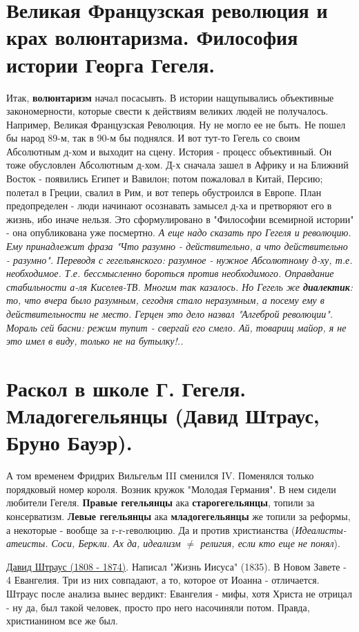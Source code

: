 \section{Великая Французская революция и крах волюнтаризма.  Философия истории Георга Гегеля. }
Итак, \textbf{волюнтаризм} начал посасывть. В истории нащупывались объективные закономерности, которые свести к действиям великих людей не получалось. Например, Великая Французская Революция. Ну не могло ее не быть. Не пошел бы народ 89-м, так в 90-м бы поднялся. И вот тут-то Гегель со своим Абсолютным д-хом и выходит на сцену. История - процесс объективный. Он тоже обусловлен Абсолютным д-хом. Д-х сначала зашел в Африку и на Ближний Восток - появились Египет и Вавилон; потом пожаловал в Китай, Персию; полетал в Греции, свалил в Рим, и вот теперь обустроился в Европе. План предопределен - люди начинают осознавать замысел д-ха и претворяют его в жизнь, ибо иначе нельзя. Это сформулировано в "Философии всемирной истории" - она опубликована уже посмертно. \textit{А еще надо сказать про Гегеля и революцию. Ему принадлежит фраза "Что разумно - действительно, а что действительно - разумно". Переводя с гегельянского: разумное - нужное Абсолютному д-ху, т.е. необходимое. Т.е. бессмысленно бороться против необходимого. Оправдание стабильности а-ля Киселев-ТВ. Многим так казалось. Но Гегель же \textbf{диалектик}: то, что вчера было разумным, сегодня стало неразумным, а посему ему в действительности не место. Герцен это дело назвал "Алгеброй революции". Мораль сей басни: режим тупит - свергай его смело. Ай, товарищ майор, я не это имел в виду, только не на бутылку!..}

\section{Раскол в школе Г. Гегеля. Младогегельянцы (Давид Штраус, Бруно Бауэр).}
А  том временем Фридрих Вильгельм III сменился IV. Поменялся только порядковый номер короля. Возник кружок "Молодая Германия". В нем сидели любители Гегеля. \textbf{Правые гегельянцы} ака \textbf{старогегельянцы}, топили за консерватизм. \textbf{Левые гегельянцы} ака \textbf{младогегельянцы} же топили за реформы, а некоторые - вообще за r-r-rеволюцию. Да и против христианства (\textit{Идеалисты-атеисты. Соси, Беркли. Ах да, идеализм $\neq$ религия, если кто еще не понял}).

\underline{Давид Штраус (1808 - 1874)}. Написал "Жизнь Иисуса" (1835). В Новом Завете - 4 Евангелия. Три из них совпадают, а то, которое от Иоанна - отличается. Штраус после анализа вынес вердикт: Евангелия - мифы, хотя Христа не отрицал - ну да, был такой человек, просто про него насочиняли потом. Правда, христианином все же был.

